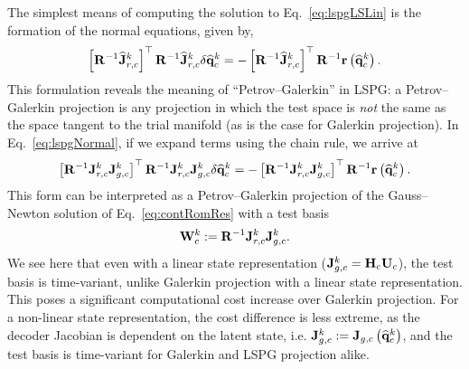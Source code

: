 The simplest means of computing the solution to Eq.~\ref{eq:lspgLSLin} is the formation of the normal equations, given by,
%
\begin{equation}\label{eq:lspgNormal}
    \left[\resScaleInv \jacobResCoefCons^{\newtonIdx}\right]^\top \resScaleInv \jacobResCoefCons^{\newtonIdx} \delta \consVecCoef^{\newtonIdx} = -\left[\resScaleInv \jacobResCoefCons^{\newtonIdx}\right]^\top \resScaleInv \resFunc{\consVecCoef^{\newtonIdx}}.
\end{equation}
%
This formulation reveals the meaning of ``Petrov--Galerkin'' in LSPG: a Petrov--Galerkin projection is any projection in which the test space is \textit{not} the same as the space tangent to the trial manifold (as is the case for Galerkin projection). In Eq.~\ref{eq:lspgNormal}, if we expand terms using the chain rule, we arrive at
%
\begin{equation}
    \left[\resScaleInv \jacobResCons^{\newtonIdx} \jacobDecodeCons^{\newtonIdx}\right]^\top \resScaleInv \jacobResCons^{\newtonIdx} \jacobDecodeCons^{\newtonIdx} \delta \consVecCoef^{\newtonIdx} = -\left[\resScaleInv \jacobResCons^{\newtonIdx} \jacobDecodeCons^{\newtonIdx}\right]^\top \resScaleInv \resFunc{\consVecCoef^{\newtonIdx}}.
\end{equation}
%
This form can be interpreted as a Petrov--Galerkin projection of the Gauss--Newton solution of Eq.~\ref{eq:contRomRes} with a test basis
%
\begin{equation}
    \testBasisCons^\newtonIdx \defEq \resScaleInv \jacobResCons^\newtonIdx \jacobDecodeCons^{\newtonIdx}.
\end{equation}
%
We see here that even with a linear state representation ($\jacobDecodeCons^{\newtonIdx} = \consScale \consTrial$), the test basis is time-variant, unlike Galerkin projection with a linear state representation. This poses a significant computational cost increase over Galerkin projection. For a non-linear state representation, the cost difference is less extreme, as the decoder Jacobian is dependent on the latent state, i.e. $\mathbf{J}_{g,c}^{k} := \mathbf{J}_{g,c} \left(\mathbf{\widehat{q}}_{c}^{k}\right)$, and the test basis is time-variant for Galerkin and LSPG projection alike.

